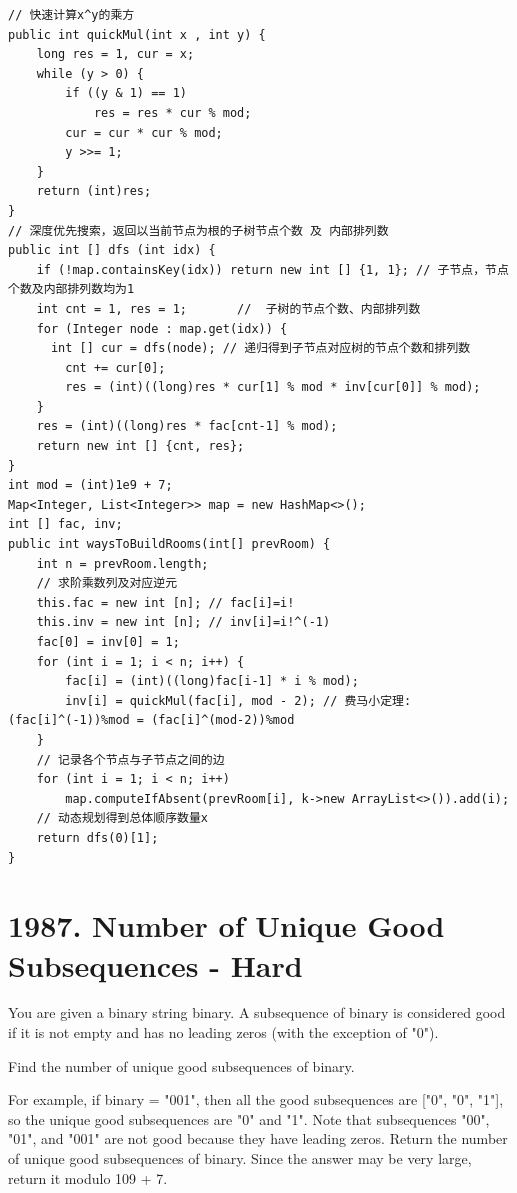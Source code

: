 \documentclass[9pt, b5paaper]{book}
\begin{document}
\begin{verbatim}
// 快速计算x^y的乘方
public int quickMul(int x , int y) {
    long res = 1, cur = x;
    while (y > 0) {
        if ((y & 1) == 1)
            res = res * cur % mod;
        cur = cur * cur % mod;
        y >>= 1;
    }
    return (int)res;
}
// 深度优先搜索，返回以当前节点为根的子树节点个数 及 内部排列数
public int [] dfs (int idx) {
    if (!map.containsKey(idx)) return new int [] {1, 1}; // 子节点，节点个数及内部排列数均为1
    int cnt = 1, res = 1;       //  子树的节点个数、内部排列数
    for (Integer node : map.get(idx)) {
      int [] cur = dfs(node); // 递归得到子节点对应树的节点个数和排列数
        cnt += cur[0];
        res = (int)((long)res * cur[1] % mod * inv[cur[0]] % mod);
    }
    res = (int)((long)res * fac[cnt-1] % mod);
    return new int [] {cnt, res};
}
int mod = (int)1e9 + 7;
Map<Integer, List<Integer>> map = new HashMap<>();
int [] fac, inv;
public int waysToBuildRooms(int[] prevRoom) {
    int n = prevRoom.length;
    // 求阶乘数列及对应逆元
    this.fac = new int [n]; // fac[i]=i!
    this.inv = new int [n]; // inv[i]=i!^(-1)
    fac[0] = inv[0] = 1;
    for (int i = 1; i < n; i++) {
        fac[i] = (int)((long)fac[i-1] * i % mod);
        inv[i] = quickMul(fac[i], mod - 2); // 费马小定理: (fac[i]^(-1))%mod = (fac[i]^(mod-2))%mod
    }
    // 记录各个节点与子节点之间的边
    for (int i = 1; i < n; i++) 
        map.computeIfAbsent(prevRoom[i], k->new ArrayList<>()).add(i);
    // 动态规划得到总体顺序数量x
    return dfs(0)[1];      
}
\end{verbatim}

\section{1987. Number of Unique Good Subsequences - Hard}
\label{sec-2-9}
You are given a binary string binary. A subsequence of binary is considered good if it is not empty and has no leading zeros (with the exception of "0").

Find the number of unique good subsequences of binary.

For example, if binary = "001", then all the good subsequences are ["0", "0", "1"], so the unique good subsequences are "0" and "1". Note that subsequences "00", "01", and "001" are not good because they have leading zeros.
Return the number of unique good subsequences of binary. Since the answer may be very large, return it modulo 109 + 7.
\end{document}
